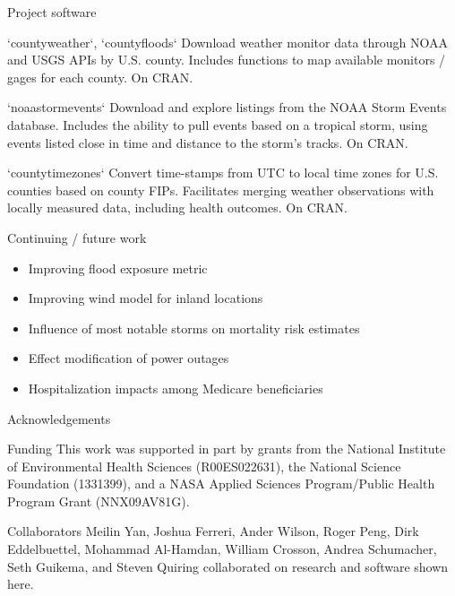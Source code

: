 \documentclass[ignorenonframetext,]{beamer}
\providecommand{\tightlist}{%
  \setlength{\itemsep}{0pt}\setlength{\parskip}{0pt}}
\begin{document}
\begin{frame}{Project software}

\footnotesize

\begin{block}{`countyweather`, `countyfloods`}
Download weather monitor data through NOAA and USGS APIs by U.S. county. Includes functions to map available monitors / gages for each county. On CRAN.
\end{block}

\footnotesize

\begin{block}{`noaastormevents`}
Download and explore listings from the NOAA Storm Events database. Includes the ability to pull events based on a tropical storm, using events listed close in time and distance to the storm's tracks. On CRAN.
\end{block}

\footnotesize

\begin{block}{`countytimezones`}
Convert time-stamps from UTC to local time zones for U.S. counties based on county FIPs. Facilitates merging weather observations with locally measured data, including health outcomes. On CRAN.
\end{block}

\end{frame}

\begin{frame}{Continuing / future work}

\begin{itemize}
\tightlist
\item
  Improving flood exposure metric
\item
  Improving wind model for inland locations
\item
  Influence of most notable storms on mortality risk estimates
\item
  Effect modification of power outages
\item
  Hospitalization impacts among Medicare beneficiaries
\end{itemize}

\end{frame}

\begin{frame}{Acknowledgements}

\small

\begin{block}{Funding}
This work was supported in part by grants from the National Institute of Environmental Health Sciences (R00ES022631), the National Science Foundation (1331399), and a NASA Applied Sciences Program/Public Health Program Grant (NNX09AV81G).
\end{block}

\begin{block}{Collaborators}
Meilin Yan, Joshua Ferreri, Ander Wilson, Roger Peng, Dirk Eddelbuettel, Mohammad Al-Hamdan, William Crosson, Andrea Schumacher, Seth Guikema, and Steven Quiring collaborated on research and software shown here.
\end{block}

\end{frame}
\end{document}
